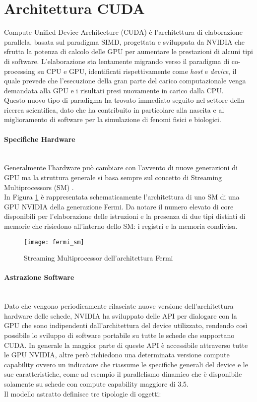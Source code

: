 \section{Architettura CUDA}

Compute Unified Device Architecture (CUDA) è l'architettura di elaborazione
parallela, basata sul paradigma SIMD,
progettata e sviluppata da NVIDIA che sfrutta la potenza di calcolo delle GPU
per aumentare le prestazioni di alcuni tipi di software.
L'elaborazione sta lentamente migrando verso il paradigma di 
co-processing su CPU e GPU, identificati rispettivamente come
\textit{host} e \textit{device}, il quale prevede che l'esecuzione della
gran parte del carico computazionale venga demandata alla GPU e i risultati
presi nuovamente in carico dalla CPU.
\\
Questo nuovo tipo di paradigma ha trovato immediato seguito nel settore
della ricerca scientifica, dato che ha contribuito in particolare alla nascita
e al miglioramento di software per la simulazione di fenomi fisici e
biologici.

\paragraph{Specifiche Hardware}\mbox{}
\\
Generalmente l'hardware può cambiare con l'avvento di
nuove generazioni di GPU ma la struttura generale si basa sempre sul concetto di
Streaming Multiprocessors (SM) \cite{nickolls2010gpu}.
\\
In Figura \ref{fig:fermi-arch} è rappresentata schematicamente l'architettura
di uno SM di una GPU NVIDIA della generazione Fermi. Da notare il
numero elevato di core disponibili per l'elaborazione delle istruzioni e la
presenza di due tipi distinti di memorie che risiedono all'interno dello SM:
i registri e la memoria condivisa.

\begin{figure}[t]
    \centering
    \texttt{[image: fermi\_sm]}
    \caption{Streaming Multiprocessor dell'architettura Fermi 
        \cite{nickolls2010gpu}}
    \label{fig:fermi-arch}
\end{figure}

\paragraph{Astrazione Software}\mbox{}
\\
Dato che vengono periodicamente rilasciate nuove versione dell'architettura
hardware delle schede, NVIDIA ha sviluppato delle API per dialogare con la GPU
che sono indipendenti dall'architettura del device utilizzato, rendendo
così possibile lo sviluppo di software portabile su tutte le schede che
supportano CUDA. In generale la maggior parte di queste API è accessibile
attraverso tutte le GPU NVIDIA, altre però richiedono una determinata versione
compute capability ovvero un indicatore che riassume le specifiche
generali del device e le sue caratteristiche, come ad esempio il parallelismo
dinamico che è disponibile solamente su schede con compute capability maggiore
di 3.5.
\\
Il modello astratto definisce tre tipologie di oggetti:

